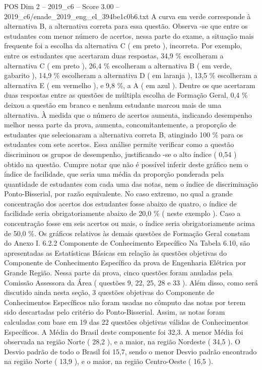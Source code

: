 \begin{textsample}{POS Dim 2 – 2019\_c6 – Score 3.00 – 2019\_c6/enade\_2019\_eng\_el\_394be1c0b6.txt}
A curva em verde corresponde à alternativa B, a alternativa correta para essa questão.
Observa -se que entre os estudantes com menor número de acertos, nessa parte do exame, a situação mais frequente foi a escolha da alternativa C ( em preto ), incorreta.
Por exemplo, entre os estudantes que acertaram duas respostas, 34,9 \% escolheram a alternativa C ( em preto ), 26,4 \% escolheram a alternativa B ( em verde, gabarito ), 14,9 \% escolheram a alternativa D ( em laranja ), 13,5 \% escolheram a alternativa E ( em vermelho ), e 9,8 \%, a A ( em azul ).
Dentre os que acertaram duas respostas entre as questões de múltipla escolha de Formação Geral, 0,4 \% deixou a questão em branco e nenhum estudante marcou mais de uma alternativa.
À medida que o número de acertos aumenta, indicando desempenho melhor nessa parte da prova, aumenta, concomitantemente, a proporção de estudantes que selecionaram a alternativa correta B, atingindo 100 \% para os estudantes com sete acertos.
Essa análise permite verificar como a questão discriminou os grupos de desempenho, justificando -se o alto índice ( 0,54 ) obtido na questão.
Cumpre notar que não é possível inferir deste gráfico nem o índice de facilidade, que seria uma média da proporção ponderada pela quantidade de estudantes com cada uma das notas, nem o índice de discriminação Ponto-Bisserial, por razão equivalente.
No caso extremo, no qual a grande concentração dos acertos dos estudantes fosse abaixo de quatro, o índice de facilidade seria obrigatoriamente abaixo de 20,0 \% ( neste exemplo ).
Caso a concentração fosse em seis acertos ou mais, o índice seria obrigatoriamente acima de 50,0 \%.
Os gráficos relativos às demais questões de Formação Geral constam do Anexo I. 6.2.2 Componente de Conhecimento Específico Na Tabela 6.10, são apresentadas as Estatísticas Básicas em relação às questões objetivas do Componente de Conhecimento Específico da prova de Engenharia Elétrica por Grande Região.
Nessa parte da prova, cinco questões foram anuladas pela Comissão Assessora da Área ( questões 9, 22, 25, 28 e 33 ).
Além disso, como será discutido ainda nesta seção, 3 questões objetivas do Componente de Conhecimentos Específicos não foram usadas no cômputo das notas por terem sido descartadas pelo critério do Ponto-Bisserial.
Assim, as notas foram calculadas com base em 19 das 22 questões objetivas válidas de Conhecimentos Específicos.
A Média do Brasil deste componente foi 32,3.
A menor Média foi observada na região Norte ( 28,2 ), e a maior, na região Nordeste ( 34,5 ).
O Desvio padrão de todo o Brasil foi 15,7, sendo o menor Desvio padrão encontrado na região Norte ( 13,9 ), e o maior, na região Centro-Oeste ( 16,5 ).

\end{textsample}
